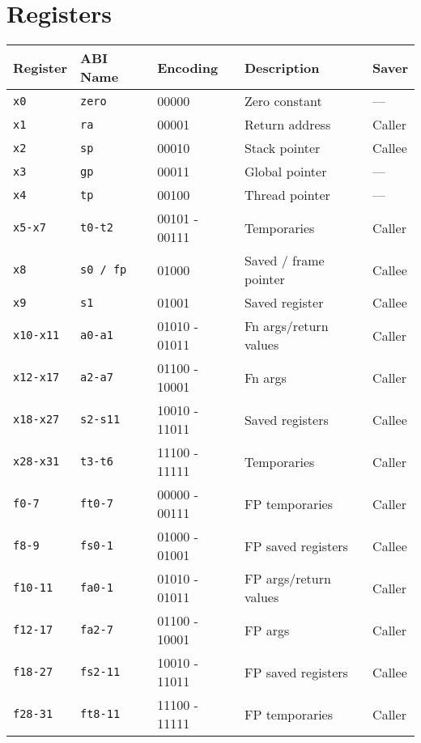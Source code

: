 \ifregisters

\section*{Registers}

\begin{center}
\begin{tabular} {l | l | T | l | l} \hline
Register     & ABI Name     & Encoding & Description           & Saver  \\ \hline
\tt{x0}      & \tt{zero}    & 00000 & Zero constant         & ---    \\
\tt{x1}      & \tt{ra}      & 00001 & Return address        & Caller \\
\tt{x2}      & \tt{sp}      & 00010 & Stack pointer         & Callee \\
\tt{x3}      & \tt{gp}      & 00011 & Global pointer        & ---    \\
\tt{x4}      & \tt{tp}      & 00100 & Thread pointer        & ---    \\
\tt{x5-x7}   & \tt{t0-t2}   & 00101 - 00111 & Temporaries           & Caller \\
\tt{x8}      & \tt{s0 / fp} & 01000 & Saved / frame pointer & Callee \\
\tt{x9}      & \tt{s1}      & 01001 & Saved register        & Callee \\
\tt{x10-x11} & \tt{a0-a1}   & 01010 - 01011 & Fn args/return values & Caller \\
\tt{x12-x17} & \tt{a2-a7}   & 01100 - 10001 & Fn args               & Caller \\
\tt{x18-x27} & \tt{s2-s11}  & 10010 - 11011 & Saved registers       & Callee \\
\tt{x28-x31} & \tt{t3-t6}   & 11100 - 11111 & Temporaries           & Caller \\ \hline
\tt{f0-7}    & \tt{ft0-7}   & 00000 - 00111 & FP temporaries        & Caller \\
\tt{f8-9}    & \tt{fs0-1}   & 01000 - 01001 & FP saved registers    & Callee \\
\tt{f10-11}  & \tt{fa0-1}   & 01010 - 01011 & FP args/return values & Caller \\
\tt{f12-17}  & \tt{fa2-7}   & 01100 - 10001 & FP args               & Caller \\
\tt{f18-27}  & \tt{fs2-11}  & 10010 - 11011 & FP saved registers    & Callee \\
\tt{f28-31}  & \tt{ft8-11}  & 11100 - 11111 & FP temporaries        & Caller \\ \hline
\end{tabular}
\end{center}

\fi